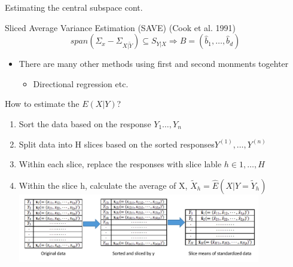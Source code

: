\documentclass[ignorenonframetext,]{beamer}
\providecommand{\tightlist}{%
  \setlength{\itemsep}{0pt}\setlength{\parskip}{0pt}}
\begin{document}
\begin{frame}{Estimating the central subspace cont.}

\begin{block}{Sliced Average Variance Estimation (SAVE) (Cook et al. 1991)} 
\[
span(\Sigma_x - \Sigma_{X|\tilde{Y}}) \subseteq S_{Y|X} \Rightarrow \hat{B} = (\hat{b}_1, \dots, \hat{b}_d)
\]
\end{block}

\begin{itemize}
\tightlist
\item
  There are many other methods using first and second monments togehter

  \begin{itemize}
  \tightlist
  \item
    Directional regression etc.
  \end{itemize}
\end{itemize}

\end{frame}

\begin{frame}{How to estimate the \(E(X|Y)\)?}

\begin{enumerate}
\def\labelenumi{\arabic{enumi}.}
\tightlist
\item
  Sort the data based on the response \(Y_1 \dots, Y_n\)\\
\item
  Split data into H slices based on the sorted
  responses\(Y^{(1)},\dots,Y^{(n)}\)\\
\item
  Within each slice, replace the responses with slice lable
  \(h \in {1, \dots, H}\)\\
\item
  Within the slice h, calculate the average of X,
  \(\tilde{X}_h = \hat{E}(X|Y = \tilde{Y}_h)\)
  \includegraphics[width=4.16667in]{./pic/slice method.png}
\end{enumerate}

\end{frame}
\end{document}

